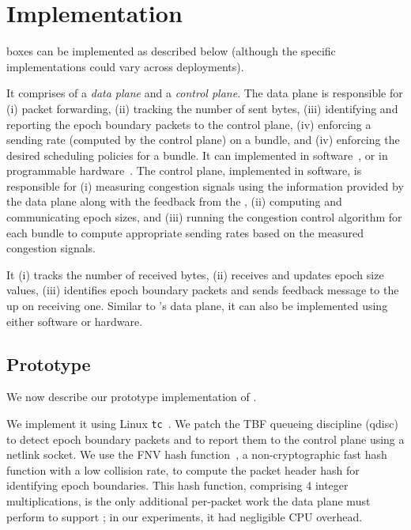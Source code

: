 \section{Implementation}\label{s:impl}
\name boxes can be implemented as described below (although the specific implementations could vary across deployments).

\Para{\capinbox} It comprises of a \emph{data plane} and a \emph{control plane}. The data plane is responsible for (i) packet forwarding, (ii) tracking the number of sent bytes, (iii) identifying and reporting the epoch boundary packets to the control plane, (iv) enforcing a sending rate (computed by the control plane) on a bundle, and (iv) enforcing the desired scheduling policies for a bundle. 
It can implemented in software~\cite{bess, click, netbricks, tc}, or in programmable hardware~\cite{p4}. 
The control plane, implemented in software, is responsible for (i) measuring congestion signals using the information provided by the data plane along with the feedback from the \outbox, (ii) computing and communicating epoch sizes, and (iii) running the congestion control algorithm for each bundle to compute appropriate sending rates based on the measured congestion signals.

\Para{\capoutbox} It (i) tracks the number of received bytes, (ii) receives and updates epoch size values, (iii) identifies epoch boundary packets and sends feedback message to the \inbox up on receiving one. Similar to \inbox's data plane, it can also be implemented using either software or hardware.

\subsection{Prototype}\label{s:impl:prototype}

We now describe our prototype implementation of \name.

 We implement it using Linux \texttt{tc}~\cite{tc}.
We patch the TBF queueing discipline (qdisc)~\cite{tbf} to detect epoch boundary packets and to report them to the control plane using a netlink socket. 
We use the FNV hash function~\cite{fnv-hash}, a non-cryptographic fast hash function with a low collision rate, to compute the packet header hash for identifying epoch boundaries.
This hash function, comprising 4 integer multiplications, is the only additional per-packet work the data plane must perform to support \name; in our experiments, it had negligible CPU overhead.

